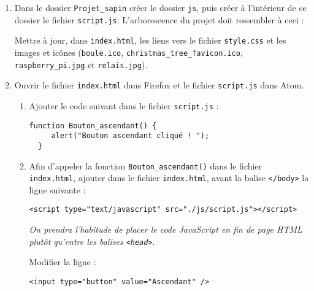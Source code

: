 \documentclass[a4paper]{article}
\begin{document}
\activite
\begin{enumerate}
  \item Dans le dossier \verb|Projet_sapin| créer le dossier \verb|js|, puis créer à l'intérieur de ce dossier le fichier \verb|script.js|. L'arborescence du projet doit ressembler à ceci : 

    \begin{center}
    \end{center}
    Mettre à jour, dans \verb|index.html|, les liens vers le fichier \verb|style.css| et les images et icônes (\verb|boule.ico|, \verb|christmas_tree_favicon.ico|, \verb|raspberry_pi.jpg| et \verb|relais.jpg|).
  \item Ouvrir le fichier \verb|index.html| dans Firefox et le fichier \verb|script.js| dans Atom.
    \begin{enumerate}
      \item Ajouter le code suivant dans le fichier \verb|script.js| : 

    \begin{verbatim}
function Bouton_ascendant() {
     alert("Bouton ascendant cliqué ! ");
  }
	\end{verbatim}

      \item Afin d'appeler la fonction \texttt{Bouton_ascendant()} dans le fichier \verb|index.html|, ajouter dans le fichier \verb|index.html|, avant la balise \texttt{</body>} la ligne suivante : 

	\begin{verbatim}
<script type="text/javascript" src="./js/script.js"></script>
	\end{verbatim}

	\textit{On prendra l'habitude de placer le code JavaScript en fin de page HTML plutôt qu'entre les balises \texttt{<head>}}.

	\medskip

	Modifier la ligne : 

	\begin{verbatim}
<input type="button" value="Ascendant" />
	\end{verbatim}


\end{enumerate}
\end{enumerate}
\end{document}
